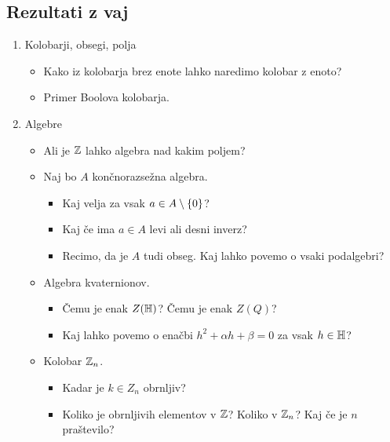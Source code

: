 \subsection*{Rezultati z vaj}
\begin{enumerate}
    \item Kolobarji, obsegi, polja
    \begin{itemize}
        \item Kako iz kolobarja brez enote lahko naredimo kolobar z enoto?
        \item {} Primer Boolova kolobarja.
    \end{itemize}

    \item Algebre
    \begin{itemize}
        \item Ali je $\mathbb{Z}$ lahko algebra nad kakim poljem?
        \item Naj bo $A$ končnorazsežna algebra.    
        \begin{itemize}
            \item Kaj velja za vsak $a \in A \setminus \left\{0\right\}$?
            \item Kaj če ima $a \in A$ levi ali desni inverz?
            \item Recimo, da je $A$ tudi obseg. Kaj lahko povemo o vsaki podalgebri?
        \end{itemize}
        \item Algebra kvaternionov.
        \begin{itemize}
            \item Čemu je enak $Z(\mathbb{H})$? Čemu je enak $Z(Q)$?
            \item Kaj lahko povemo o enačbi $h^2 + \alpha h + \beta = 0$ za vsak $h \in \mathbb{H}$?
        \end{itemize}

        \item Kolobar $\mathbb{Z}_n$.
        \begin{itemize}
            \item Kadar je $k \in Z_n$ obrnljiv?
            \item Koliko je obrnljivih elementov v $\mathbb{Z}$? Koliko v $\mathbb{Z}_n$? Kaj če je $n$ praštevilo?
        \end{itemize}
    \end{itemize}
\end{enumerate}
